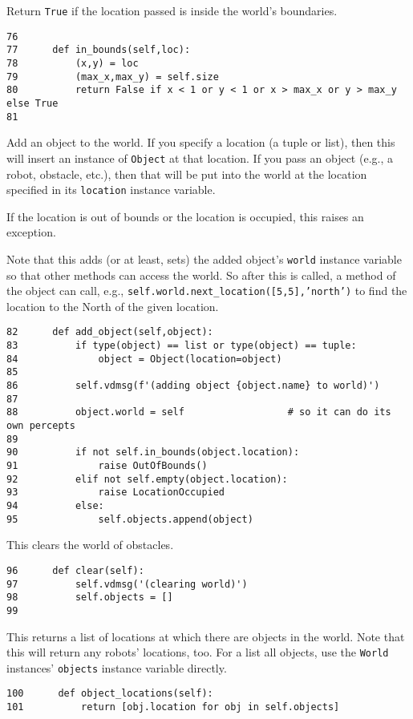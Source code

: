 \documentclass[11pt]{tufte-handout}
\begin{document}
Return \texttt{True} if the location passed is inside the world's boundaries.
\begin{verbatim}
76  
77      def in_bounds(self,loc):
78          (x,y) = loc
79          (max_x,max_y) = self.size
80          return False if x < 1 or y < 1 or x > max_x or y > max_y else True
81  
\end{verbatim}

Add an object to the world.  If you specify a location (a tuple or list), then this will insert an instance of \texttt{Object} at that location.  If you pass an object (e.g., a robot, obstacle, etc.), then that will be put into the world at the location specified in its \texttt{location} instance variable.

If the location is out of bounds or the location is occupied, this raises an exception.

Note that this adds (or at least, sets) the added object's \texttt{world} instance variable so that other methods can access the world.  So after this is called, a method of the object can call, e.g., \texttt{self.world.next\_location([5,5],'north')} to find the location to the North of the given location.

\begin{verbatim}
82      def add_object(self,object):
83          if type(object) == list or type(object) == tuple:
84              object = Object(location=object)
85  
86          self.vdmsg(f'(adding object {object.name} to world)')
87  
88          object.world = self                  # so it can do its own percepts
89  
90          if not self.in_bounds(object.location):
91              raise OutOfBounds()
92          elif not self.empty(object.location):
93              raise LocationOccupied
94          else:
95              self.objects.append(object)
\end{verbatim}

This clears the world of obstacles.

\begin{verbatim}
96      def clear(self):
97          self.vdmsg('(clearing world)')
98          self.objects = []
99  
\end{verbatim}

This returns a list of locations at which there are objects in the world.  Note that this will return any robots' locations, too.  For a list all objects, use the \texttt{World} instances' \texttt{objects} instance variable directly.

\begin{verbatim}
100      def object_locations(self):
101          return [obj.location for obj in self.objects]
\end{verbatim}
\end{document}
